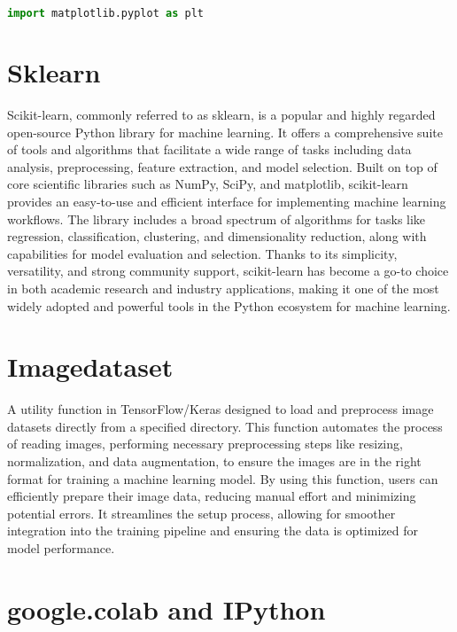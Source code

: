 \begin{lstlisting}[language=Python, caption={Importing the Matplotlib library for plotting}, label={code:import-matplotlib}, style=pythonstyle]
	import matplotlib.pyplot as plt
\end{lstlisting}

\section{Sklearn}

Scikit-learn, commonly referred to as sklearn, is a popular and highly regarded open-source Python library for machine learning. It offers a comprehensive suite of tools and algorithms that facilitate a wide range of tasks including data analysis, preprocessing, feature extraction, and model selection. Built on top of core scientific libraries such as NumPy, SciPy, and matplotlib, scikit-learn provides an easy-to-use and efficient interface for implementing machine learning workflows. The library includes a broad spectrum of algorithms for tasks like regression, classification, clustering, and dimensionality reduction, along with capabilities for model evaluation and selection. Thanks to its simplicity, versatility, and strong community support, scikit-learn has become a go-to choice in both academic research and industry applications, making it one of the most widely adopted and powerful tools in the Python ecosystem for machine learning.

\section{Imagedataset}

A utility function in TensorFlow/Keras designed to load and preprocess image datasets directly from a specified directory. This function automates the process of reading images, performing necessary preprocessing steps like resizing, normalization, and data augmentation, to ensure the images are in the right format for training a machine learning model. By using this function, users can efficiently prepare their image data, reducing manual effort and minimizing potential errors. It streamlines the setup process, allowing for smoother integration into the training pipeline and ensuring the data is optimized for model performance.


\section{google.colab and IPython}


